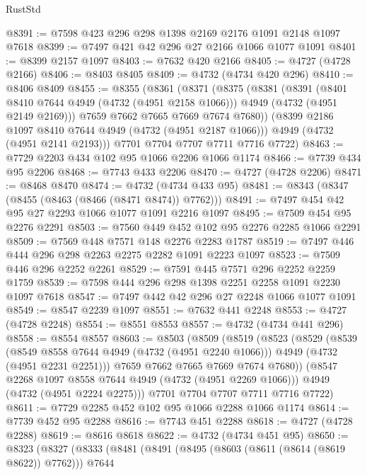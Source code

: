 \begin{lexlean}{RustStd}
\begin{coremodule}
@8391 := @7598 @423 @296 @298 @1398 @2169 @2176 @1091 @2148 @1097 @7618
@8399 := @7497 @421 @42 @296 @27 @2166 @1066 @1077 @1091
@8401 := @8399 @2157 @1097
@8403 := @7632 @420 @2166
@8405 := @4727 (@4728 @2166)
@8406 := @8403 @8405
@8409 := @4732 (@4734 @420 @296)
@8410 := @8406 @8409
@8455 := @8355
    (@8361
      (@8371
        (@8375
          (@8381
            (@8391
              (@8401 @8410 @7644 @4949 (@4732 (@4951 @2158 @1066)))
              @4949
              (@4732 (@4951 @2149 @2169)))
            @7659
            @7662
            @7665
            @7669
            @7674
            @7680))
        (@8399 @2186 @1097 @8410 @7644 @4949 (@4732 (@4951 @2187 @1066)))
        @4949
        (@4732 (@4951 @2141 @2193)))
      @7701
      @7704
      @7707
      @7711
      @7716
      @7722)
@8463 := @7729 @2203 @434 @102 @95 @1066 @2206 @1066 @1174
@8466 := @7739 @434 @95 @2206
@8468 := @7743 @433 @2206
@8470 := @4727 (@4728 @2206)
@8471 := @8468 @8470
@8474 := @4732 (@4734 @433 @95)
@8481 := @8343 (@8347 (@8455 (@8463 (@8466 (@8471 @8474)) @7762)))
@8491 := @7497 @454 @42 @95 @27 @2293 @1066 @1077 @1091 @2216 @1097
@8495 := @7509 @454 @95 @2276 @2291
@8503 := @7560 @449 @452 @102 @95 @2276 @2285 @1066 @2291
@8509 := @7569 @448 @7571 @148 @2276 @2283 @1787
@8519 := @7497 @446 @444 @296 @298 @2263 @2275 @2282 @1091 @2223 @1097
@8523 := @7509 @446 @296 @2252 @2261
@8529 := @7591 @445 @7571 @296 @2252 @2259 @1759
@8539 := @7598 @444 @296 @298 @1398 @2251 @2258 @1091 @2230 @1097 @7618
@8547 := @7497 @442 @42 @296 @27 @2248 @1066 @1077 @1091
@8549 := @8547 @2239 @1097
@8551 := @7632 @441 @2248
@8553 := @4727 (@4728 @2248)
@8554 := @8551 @8553
@8557 := @4732 (@4734 @441 @296)
@8558 := @8554 @8557
@8603 := @8503
    (@8509
      (@8519
        (@8523
          (@8529
            (@8539
              (@8549 @8558 @7644 @4949 (@4732 (@4951 @2240 @1066)))
              @4949
              (@4732 (@4951 @2231 @2251)))
            @7659
            @7662
            @7665
            @7669
            @7674
            @7680))
        (@8547 @2268 @1097 @8558 @7644 @4949 (@4732 (@4951 @2269 @1066)))
        @4949
        (@4732 (@4951 @2224 @2275)))
      @7701
      @7704
      @7707
      @7711
      @7716
      @7722)
@8611 := @7729 @2285 @452 @102 @95 @1066 @2288 @1066 @1174
@8614 := @7739 @452 @95 @2288
@8616 := @7743 @451 @2288
@8618 := @4727 (@4728 @2288)
@8619 := @8616 @8618
@8622 := @4732 (@4734 @451 @95)
@8650 := @8323
    (@8327
      (@8333
        (@8481
          (@8491
            (@8495 (@8603 (@8611 (@8614 (@8619 @8622)) @7762)))
            @7644

\end{coremodule}
\end{lexlean}
